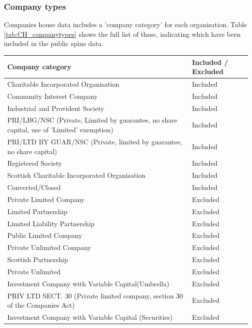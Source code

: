 \documentclass{article}
\begin{document}


\subsubsection{Company types}
Companies house data includes a 'company category' for each organisation. Table \ref{tab:CH_companytypes} shows the 
full list of these, indicating which have been included in the public spine data.

\begin{table}[h]
  \centering
  \begin{tabularx}{\textwidth}{|X|l|}
    \hline
    Company category  &	Included / Excluded \\ \hline
    \hline
    Charitable Incorporated Organisation & Included \\ \hline
    Community Interest Company & Included \\ \hline
    Industrial and Provident Society & Included \\ \hline
    PRI/LBG/NSC (Private, Limited by guarantee, no share capital, use of 'Limited' exemption) & Included \\ \hline
    PRI/LTD BY GUAR/NSC (Private, limited by guarantee, no share capital) & Included \\ \hline
    Registered Society & Included \\ \hline
    Scottish Charitable Incorporated Organisation & Included \\ \hline
    Converted/Closed & Included \\ \hline
    \hline
    Private Limited Company & Excluded \\ \hline
    Limited Partnership & Excluded \\ \hline
    Limited Liability Partnership & Excluded \\ \hline
    Public Limited Company & Excluded \\ \hline
    Private Unlimited Company & Excluded \\ \hline
    Scottish Partnership & Excluded \\ \hline
    Private Unlimited & Excluded \\ \hline
    Investment Company with Variable Capital(Umbrella) & Excluded \\ \hline
    PRIV LTD SECT. 30 (Private limited company, section 30 of the Companies Act) & Excluded \\ \hline
    Investment Company with Variable Capital (Securities) & Excluded \\ \hline

\end{tabularx}
\end{table}
\end{document}
